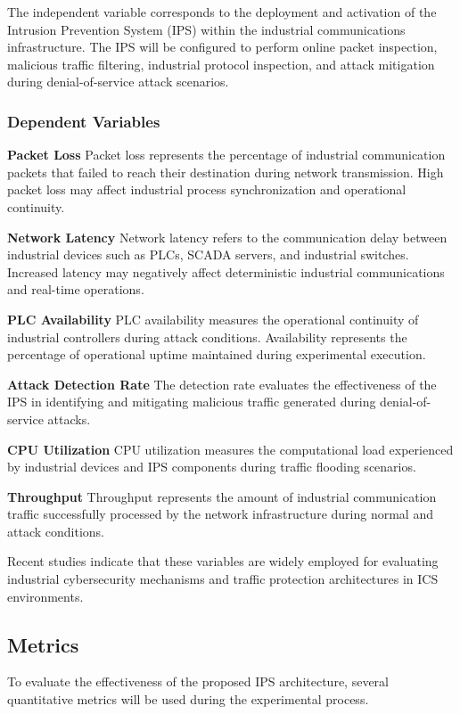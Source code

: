 \documentclass[sigconf]{acmart}
\begin{document}
The independent variable corresponds to the deployment and activation of the Intrusion Prevention System (IPS) within the industrial communications infrastructure. The IPS will be configured to perform online packet inspection, malicious traffic filtering, industrial protocol inspection, and attack mitigation during denial-of-service attack scenarios.

\subsubsection{Dependent Variables}
\textbf{Packet Loss}
Packet loss represents the percentage of industrial communication packets that failed to reach their destination during network transmission. High packet loss may affect industrial process synchronization and operational continuity.

\textbf{Network Latency}
Network latency refers to the communication delay between industrial devices such as PLCs, SCADA servers, and industrial switches. Increased latency may negatively affect deterministic industrial communications and real-time operations.

\textbf{PLC Availability}
PLC availability measures the operational continuity of industrial controllers during attack conditions. Availability represents the percentage of operational uptime maintained during experimental execution.

\textbf{Attack Detection Rate}
The detection rate evaluates the effectiveness of the IPS in identifying and mitigating malicious traffic generated during denial-of-service attacks.

\textbf{CPU Utilization}
CPU utilization measures the computational load experienced by industrial devices and IPS components during traffic flooding scenarios.

\textbf{Throughput}
Throughput represents the amount of industrial communication traffic successfully processed by the network infrastructure during normal and attack conditions.

Recent studies indicate that these variables are widely employed for evaluating industrial cybersecurity mechanisms and traffic protection architectures in ICS environments.

\subsection{Metrics}
To evaluate the effectiveness of the proposed IPS architecture, several quantitative metrics will be used during the experimental process.
\end{document}
